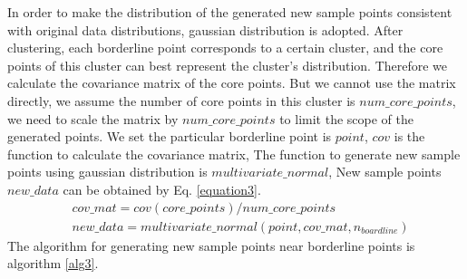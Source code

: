 \documentclass[runningheads]{llncs}
\begin{document}
In order to make the distribution of the generated new sample points 
consistent with original data distributions,
gaussian distribution is adopted.
After clustering, each borderline point corresponds to a certain cluster, 
and the core points of this cluster can best represent the cluster's distribution.
Therefore we calculate the covariance matrix of the core points. 
But we cannot use the matrix directly, we 
assume the number of core points in this cluster is $num\_core\_points$,
we need to scale the matrix by $num\_core\_points$ to limit 
the scope of the generated points.
We set the particular borderline point is $point$, 
$cov$ is the function to calculate the covariance matrix,
The function to generate new sample points using 
gaussian distribution is $multivariate\_normal$,
New sample points $new\_data$ can be obtained by Eq. \ref{equation3}.
\begin{equation}
  \label{equation3}
  \begin{aligned}
      & cov\_mat=cov(core\_points)/num\_core\_points \\
      & new\_data=multivariate\_normal(point,cov\_mat,n_{boardline})
  \end{aligned}
\end{equation}
The algorithm for generating new sample points near borderline points is algorithm \ref{alg3}.
\end{document}
